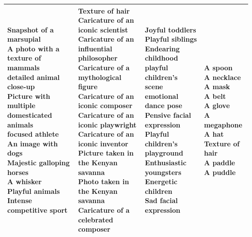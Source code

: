 \documentclass{article}
\begin{document}
\begin{table}[htbp]
\begin{tabular}{|p{4.0cm}|p{4.0cm}|p{4.0cm}|p{4.0cm}|}
\hline
\makecell[t]{Snapshot of a marsupial \\ A photo with a texture of mammals \\ detailed animal close-up \\ Picture with multiple domesticated animals \\ focused athlete \\ An image with dogs \\ Majestic galloping horses \\ A whisker \\ Playful animals \\ Intense competitive sport} & \makecell[t]{Texture of hair \\ Caricature of an iconic scientist \\ Caricature of an influential philosopher \\ Caricature of a mythological figure \\ Caricature of an iconic composer \\ Caricature of an iconic playwright \\ Caricature of an iconic inventor \\ Picture taken in the Kenyan savanna \\ Photo taken in the Kenyan savanna \\ Caricature of a celebrated composer} & \makecell[t]{Joyful toddlers \\ Playful siblings \\ Endearing childhood \\ playful children's scene \\ emotional dance pose \\ Pensive facial expression \\ Playful children's playground \\ Enthusiastic youngsters \\ Energetic children \\ Sad facial expression} & \makecell[t]{A spoon \\ A necklace \\ A mask \\ A belt \\ A glove \\ A megaphone \\ A hat \\ Texture of hair \\ A paddle \\ A puddle} \\
\hline

\end{tabular}
\end{table}
\end{document}
